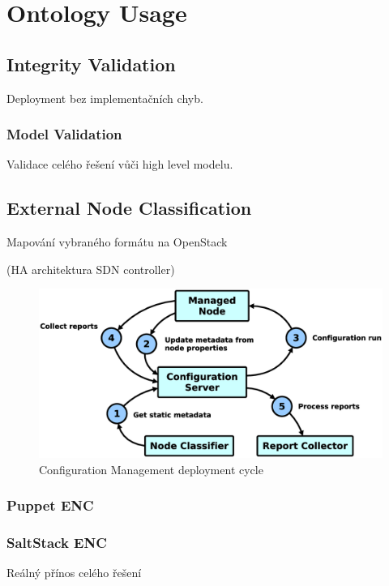 
\section{Ontology Usage}

\subsection{Integrity Validation}

Deployment bez implementačních chyb.

\subsubsection{Model Validation}

Validace celého řešení vůči high level modelu.

\subsection{External Node Classification}

Mapování vybraného formátu na OpenStack

(HA architektura SDN controller)

\begin{figure}[!h]
\centering
\includegraphics[scale=.15]{img/cm_cycle.eps}
\caption{Configuration Management deployment cycle}
\label{fig:cm}
\end{figure}

\subsubsection{Puppet ENC}

\subsubsection{SaltStack ENC}

Reálný přínos celého řešení

